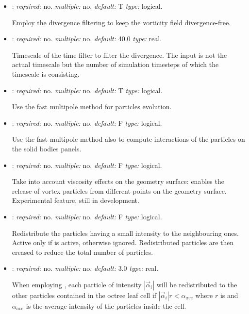 \begin{itemize}
\item {}: \textit{required:} no. \textit{multiple:} no. 
\textit{default:} T \textit{type:} logical.

Employ the divergence filtering to keep the vorticity field divergence-free. 

\item {}: \textit{required:} no. \textit{multiple:} no. 
\textit{default:} 40.0 \textit{type:} real.

Timescale of the time filter to filter the divergence. 
The input is not the actual timescale but the number of simulation timesteps 
of which the timescale is consisting. 

\item {}: \textit{required:} no. \textit{multiple:} no. \textit{default:} T 
\textit{type:} logical.

Use the fast multipole method for particles evolution.

\item {}: \textit{required:} no. \textit{multiple:} no. 
\textit{default:} F \textit{type:} logical.

Use the fast multipole method also to compute interactions 
of the particles on the solid bodies panels.

\item {}: \textit{required:} no. \textit{multiple:} no. 
\textit{default:} F \textit{type:} logical.

Take into account viscosity effects on the geometry surface: 
enables the release of vortex particles from different points 
on the geometry surface. Experimental feature, still in development.

\item {}: \textit{required:} no. 
\textit{multiple:} no. \textit{default:} F \textit{type:} logical.

Redistribute the particles having a small intensity to the neighbouring ones. 
Active only if  is active, otherwise ignored. Redistributed particles 
are then ereased to reduce the total number of particles.

\item {}: \textit{required:} no. 
\textit{multiple:} no. \textit{default:} 3.0 \textit{type:} real.

When employing , each particle of intensity 
$|\vec{\alpha}_i|$ will be redistributed to the other particles contained 
in the octree leaf cell if $|\vec{\alpha}_i| r < \alpha_{ave}$ where $r$ is 
 and $\alpha_{ave}$ is the average 
intensity of the particles inside the cell.


\end{itemize}
